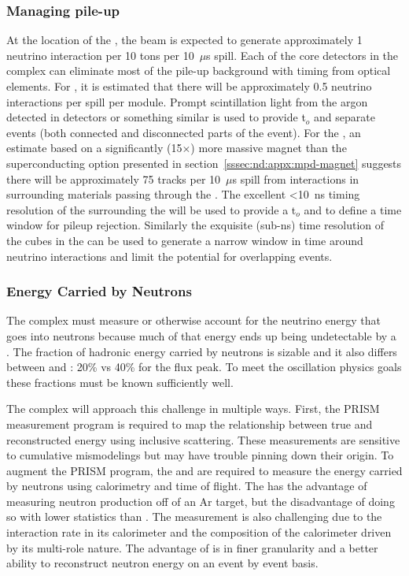 \subsubsection{Managing pile-up}
At the location of the  , the  beam is expected to generate approximately 1 neutrino interaction per 10 tons per 10~$\mu$s spill.   
Each of the core detectors in the  complex can eliminate most of the pile-up background with timing from optical elements. For , it is estimated that there will be approximately 0.5 neutrino interactions per spill per  module. Prompt scintillation light from the argon detected in  detectors or something similar is used to provide t$_{o}$ and separate events (both connected and disconnected parts of the event).  For the , an estimate based on a significantly (15$\times$) more massive magnet than the superconducting option presented in section~\ref{sssec:nd:appx:mpd-magnet} suggests there will be approximately 75 tracks per 10~$\mu$s spill from interactions in surrounding materials passing through the .  The excellent <10~ns timing resolution of the  surrounding the  will be used to provide a t$_{o}$ and to define a time window for pileup rejection.  Similarly the exquisite (sub-ns) time resolution of the cubes in the  can be used to generate a narrow window in time around neutrino interactions and limit the potential for overlapping events.  



\subsubsection{Energy Carried by Neutrons}

The   complex must measure or otherwise account for the neutrino energy that goes into neutrons because much of that energy ends up being undetectable by a . The fraction of hadronic energy carried by neutrons is sizable and it also differs between \numu and \anumu: 20\% vs 40\% for the flux peak. To meet the oscillation physics goals these fractions must be known sufficiently well. %

The complex will approach this challenge in multiple ways. First, the PRISM measurement program is required to map the relationship between true and reconstructed energy using inclusive  scattering. %
These measurements are sensitive to cumulative mismodelings but may have trouble pinning down their origin. To augment the PRISM program, the  and  are required to measure the energy carried by neutrons using calorimetry and time of flight. 
The  has the advantage of measuring neutron production off of an Ar target, but the disadvantage of doing so with lower statistics than  . The  measurement is also challenging due to the interaction rate in its calorimeter and the composition of the calorimeter driven by its multi-role nature. The advantage of   is in finer granularity and a better ability to reconstruct neutron energy on an event by event basis.



